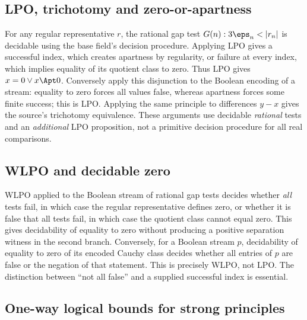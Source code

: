 \subsection{LPO, trichotomy and zero-or-apartness}\label{supp:14-2}
\par{}\par\smallskip

For any regular representative $r$, the rational gap test $G(n):3\eps_n<|r_n|$ is decidable using the base field's decision procedure. Applying LPO gives a successful index, which creates apartness by regularity, or failure at every index, which implies equality of its quotient class to zero. Thus LPO gives $x=0\lor x\Apt0$. Conversely apply this disjunction to the Boolean encoding of a stream: equality to zero forces all values false, whereas apartness forces some finite success; this is LPO. Applying the same principle to differences $y-x$ gives the source's trichotomy equivalence. These arguments use decidable \emph{rational} tests and an \emph{additional} LPO proposition, not a primitive decision procedure for all real comparisons.

\subsection{WLPO and decidable zero}\label{supp:14-3}
\par{}\par\smallskip

WLPO applied to the Boolean stream of rational gap tests decides whether \emph{all} tests fail, in which case the regular representative defines zero, or whether it is false that all tests fail, in which case the quotient class cannot equal zero. This gives decidability of equality to zero without producing a positive separation witness in the second branch. Conversely, for a Boolean stream $p$, decidability of equality to zero of its encoded Cauchy class decides whether all entries of $p$ are false or the negation of that statement. This is precisely WLPO, not LPO. The distinction between ``not all false'' and a supplied successful index is essential.

\subsection{One-way logical bounds for strong principles}\label{supp:14-4}
\par{}\par\smallskip

